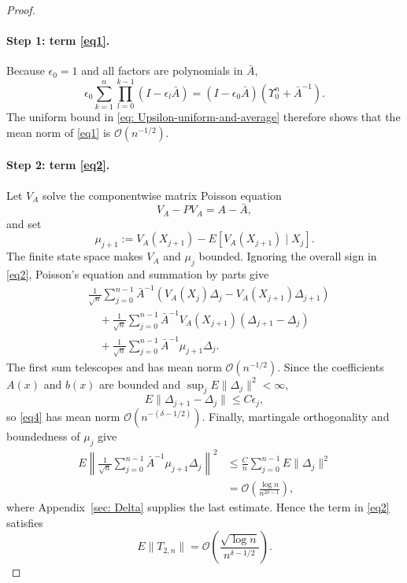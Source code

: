 \documentclass[11pt]{article}
\begin{document}
\begin{proof}
\paragraph{Step 1: term \eqref{eq1}.}
Because $\epsilon_0=1$ and all factors are polynomials in $\bar A$,
\[
\epsilon_0\sum_{k=1}^n\prod_{l=0}^{k-1}(I-\epsilon_l\bar A)
=
(I-\epsilon_0\bar A)(\Upsilon_0^n+\bar A^{-1}).
\]
The uniform bound in \eqref{eq: Upsilon-uniform-and-average} therefore shows
that the mean norm of \eqref{eq1} is $\mathcal O(n^{-1/2})$.

\paragraph{Step 2: term \eqref{eq2}.}
Let $V_A$ solve the componentwise matrix Poisson equation
\[
    V_A-PV_A=A-\bar A,
\]
and set
\[
    \mu_{j+1}:=V_A(X_{j+1})-E[V_A(X_{j+1})\mid X_j].
\]
The finite state space makes $V_A$ and $\mu_j$ bounded. Ignoring the overall
sign in \eqref{eq2}, Poisson's equation and summation by parts give
\begin{align}
&\frac1{\sqrt n}\sum_{j=0}^{n-1}
\bar A^{-1}(V_A(X_j)\Delta_j-V_A(X_{j+1})\Delta_{j+1})
\label{eq3}\\
&\quad+
\frac1{\sqrt n}\sum_{j=0}^{n-1}
\bar A^{-1}V_A(X_{j+1})(\Delta_{j+1}-\Delta_j)
\label{eq4}\\
&\quad+
\frac1{\sqrt n}\sum_{j=0}^{n-1}
\bar A^{-1}\mu_{j+1}\Delta_j.
\label{eq5}
\end{align}
The first sum telescopes and has mean norm $\mathcal O(n^{-1/2})$. Since the
coefficients $A(x)$ and $b(x)$ are bounded and
$\sup_jE\|\Delta_j\|^2<\infty$,
\[
    E\|\Delta_{j+1}-\Delta_j\|
    \leq C\epsilon_j,
\]
so \eqref{eq4} has mean norm
$\mathcal O(n^{-(\delta-1/2)})$. Finally, martingale orthogonality and
boundedness of $\mu_j$ give
\begin{align*}
E\left\|
\frac1{\sqrt n}\sum_{j=0}^{n-1}
\bar A^{-1}\mu_{j+1}\Delta_j
\right\|^2
&\leq
\frac Cn\sum_{j=0}^{n-1}E\|\Delta_j\|^2\\
&=
\mathcal O\!\left(\frac{\log n}{n^{2\delta-1}}\right),
\end{align*}
where Appendix~\ref{sec: Delta} supplies the last estimate. Hence the term
in \eqref{eq2} satisfies
\begin{equation}\label{eq: TD step2 bound}
    E\|T_{2,n}\|
    =
    \mathcal O\!\left(
        \frac{\sqrt{\log n}}{n^{\delta-1/2}}
    \right).
\end{equation}


\end{proof}
\end{document}
